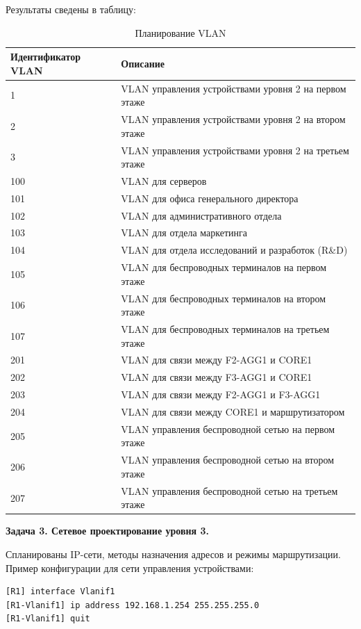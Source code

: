 Результаты сведены в таблицу:

\begin{table}[h]
\small
\centering
\caption{Планирование VLAN}
\begin{tabular}{|l|l|}
\hline
\textbf{Идентификатор VLAN} & \textbf{Описание} \\ \hline
1 & VLAN управления устройствами уровня 2 на первом этаже \\ \hline
2 & VLAN управления устройствами уровня 2 на втором этаже \\ \hline
3 & VLAN управления устройствами уровня 2 на третьем этаже \\ \hline
100 & VLAN для серверов \\ \hline
101 & VLAN для офиса генерального директора \\ \hline
102 & VLAN для административного отдела \\ \hline
103 & VLAN для отдела маркетинга \\ \hline
104 & VLAN для отдела исследований и разработок (R\&D) \\ \hline
105 & VLAN для беспроводных терминалов на первом этаже \\ \hline
106 & VLAN для беспроводных терминалов на втором этаже \\ \hline
107 & VLAN для беспроводных терминалов на третьем этаже \\ \hline
201 & VLAN для связи между F2-AGG1 и CORE1 \\ \hline
202 & VLAN для связи между F3-AGG1 и CORE1 \\ \hline
203 & VLAN для связи между F2-AGG1 и F3-AGG1 \\ \hline
204 & VLAN для связи между CORE1 и маршрутизатором \\ \hline
205 & VLAN управления беспроводной сетью на первом этаже \\ \hline
206 & VLAN управления беспроводной сетью на втором этаже \\ \hline
207 & VLAN управления беспроводной сетью на третьем этаже \\ \hline
\end{tabular}
\end{table}

\textbf{Задача 3. Сетевое проектирование уровня 3.}

Спланированы IP-сети, методы назначения адресов и режимы маршрутизации.
Пример конфигурации для сети управления устройствами:

\begin{verbatim}
[R1] interface Vlanif1
[R1-Vlanif1] ip address 192.168.1.254 255.255.255.0
[R1-Vlanif1] quit
\end{verbatim}

